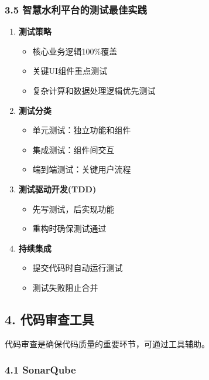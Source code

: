 \subsubsection{3.5
智慧水利平台的测试最佳实践}\label{ux667aux6167ux6c34ux5229ux5e73ux53f0ux7684ux6d4bux8bd5ux6700ux4f73ux5b9eux8df5}

\begin{enumerate}
\def\labelenumi{\arabic{enumi}.}
\tightlist
\item
  \textbf{测试策略}

  \begin{itemize}
  \tightlist
  \item
    核心业务逻辑100\%覆盖
  \item
    关键UI组件重点测试
  \item
    复杂计算和数据处理逻辑优先测试
  \end{itemize}
\item
  \textbf{测试分类}

  \begin{itemize}
  \tightlist
  \item
    单元测试：独立功能和组件
  \item
    集成测试：组件间交互
  \item
    端到端测试：关键用户流程
  \end{itemize}
\item
  \textbf{测试驱动开发(TDD)}

  \begin{itemize}
  \tightlist
  \item
    先写测试，后实现功能
  \item
    重构时确保测试通过
  \end{itemize}
\item
  \textbf{持续集成}

  \begin{itemize}
  \tightlist
  \item
    提交代码时自动运行测试
  \item
    测试失败阻止合并
  \end{itemize}
\end{enumerate}

\subsection{4. 代码审查工具}\label{ux4ee3ux7801ux5ba1ux67e5ux5de5ux5177}

代码审查是确保代码质量的重要环节，可通过工具辅助。

\subsubsection{4.1 SonarQube}\label{sonarqube}

